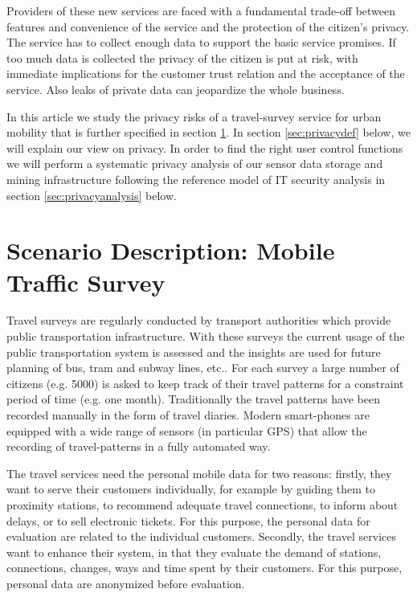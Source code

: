 \documentclass[runningheads,a4paper]{llncs}
\begin{document}
Providers of these new services are faced with a fundamental trade-off
between features and convenience of the service and the protection of
the citizen's privacy. The service has to collect enough data to
support the basic service promises. If too much data is collected the
privacy of the citizen is put at risk, with immediate implications for
the customer trust relation and the acceptance of the service. Also
leaks of private data can jeopardize the whole business.

In this article we study the privacy risks of a travel-survey service
for urban mobility that is further specified in section \ref{sec:ScenarioDescription}. In section \ref{sec:privacydef} below, we will explain our view on privacy. In order to find the right user control functions we will perform a systematic privacy analysis of our sensor data storage and mining infrastructure following the reference model of IT security analysis \cite{Grimm:ItSecRefModel} in section \ref{sec:privacyanalysis} below.


\section{Scenario Description: Mobile Traffic Survey}
\label{sec:ScenarioDescription}

Travel surveys are regularly conducted by transport authorities which provide
public transportation infrastructure. With these surveys the current
usage of the public transportation system is assessed and the insights
are used for future planning of bus, tram and subway lines, etc..  For
each survey a large number of citizens (e.g. 5000) is asked to keep
track of their travel patterns for a constraint period of time
(e.g. one month). Traditionally the travel patterns have been recorded
manually in the form of travel diaries. Modern smart-phones are
equipped with a wide range of sensors (in particular GPS) that allow
the recording of travel-patterns in a fully automated way.

The travel services need the personal mobile data for two reasons: firstly, they want to serve their customers individually, for example by guiding them to proximity stations, to recommend adequate travel connections, to inform about delays, or to sell electronic tickets. For this purpose, the personal data for evaluation are related to the individual customers. Secondly, the travel services want to enhance their system, in that they evaluate the demand of stations, connections, changes, ways and time spent by their customers. For this purpose, personal data are anonymized before evaluation.
\end{document}
